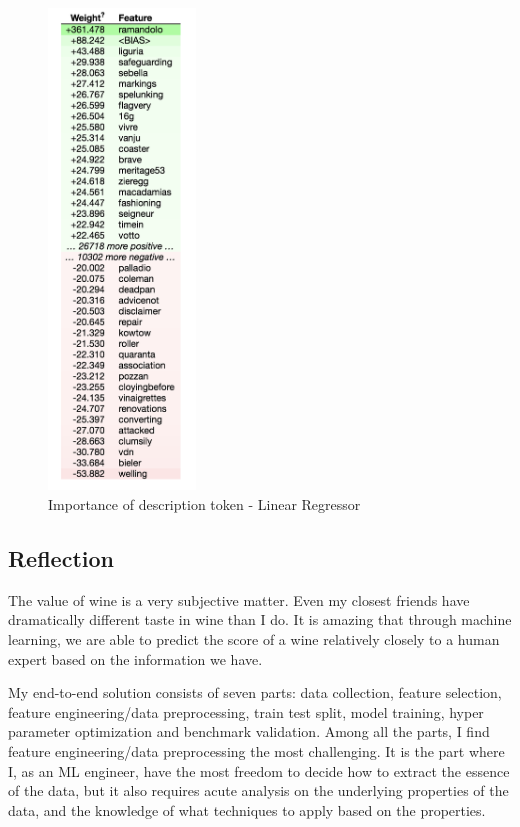 \documentclass{article}
\begin{document}
\begin{figure}[H]
\caption{Importance of description token - Linear Regressor}
\centering
\includegraphics[width=0.35\textwidth]{graphs/lr_token_weights}
\end{figure}

\subsection{Reflection}
The value of wine is a very subjective matter. Even my closest friends have dramatically different taste in wine than I do. It is amazing that through machine learning, we are able to predict the score of a wine relatively closely to a human expert based on the information we have.

My end-to-end solution consists of seven parts: data collection, feature selection, feature engineering/data preprocessing, train test split, model training, hyper parameter optimization and benchmark validation. Among all the parts, I find feature engineering/data preprocessing the most challenging. It is the part where I, as an ML engineer, have the most freedom to decide how to extract the essence of the data, but it also requires acute analysis on the underlying properties of the data, and the knowledge of what techniques to apply based on the properties.
\end{document}
